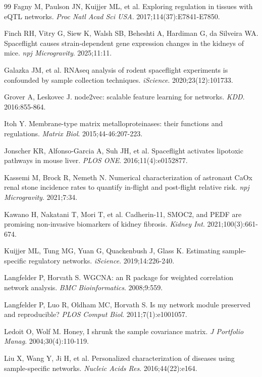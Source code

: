 \documentclass[11pt]{article}
\begin{document}
\begin{thebibliography}{99}
 Fagny M, Paulson JN, Kuijjer ML, et al. Exploring regulation in tissues with eQTL networks. \emph{Proc Natl Acad Sci USA}. 2017;114(37):E7841-E7850.

 Finch RH, Vitry G, Siew K, Walsh SB, Beheshti A, Hardiman G, da Silveira WA. Spaceflight causes strain-dependent gene expression changes in the kidneys of mice. \emph{npj Microgravity}. 2025;11:11.

 Galazka JM, et al. RNAseq analysis of rodent spaceflight experiments is confounded by sample collection techniques. \emph{iScience}. 2020;23(12):101733.

 Grover A, Leskovec J. node2vec: scalable feature learning for networks. \emph{KDD}. 2016:855-864.

 Itoh Y. Membrane-type matrix metalloproteinases: their functions and regulations. \emph{Matrix Biol}. 2015;44-46:207-223.

 Jonscher KR, Alfonso-Garcia A, Suh JH, et al. Spaceflight activates lipotoxic pathways in mouse liver. \emph{PLOS ONE}. 2016;11(4):e0152877.

 Kassemi M, Brock R, Nemeth N. Numerical characterization of astronaut CaOx renal stone incidence rates to quantify in-flight and post-flight relative risk. \emph{npj Microgravity}. 2021;7:34.

 Kawano H, Nakatani T, Mori T, et al. Cadherin-11, SMOC2, and PEDF are promising non-invasive biomarkers of kidney fibrosis. \emph{Kidney Int}. 2021;100(3):661-674.

 Kuijjer ML, Tung MG, Yuan G, Quackenbush J, Glass K. Estimating sample-specific regulatory networks. \emph{iScience}. 2019;14:226-240.

 Langfelder P, Horvath S. WGCNA: an R package for weighted correlation network analysis. \emph{BMC Bioinformatics}. 2008;9:559.

 Langfelder P, Luo R, Oldham MC, Horvath S. Is my network module preserved and reproducible? \emph{PLOS Comput Biol}. 2011;7(1):e1001057.

 Ledoit O, Wolf M. Honey, I shrunk the sample covariance matrix. \emph{J Portfolio Manag}. 2004;30(4):110-119.

 Liu X, Wang Y, Ji H, et al. Personalized characterization of diseases using sample-specific networks. \emph{Nucleic Acids Res}. 2016;44(22):e164.


\end{thebibliography}
\end{document}
